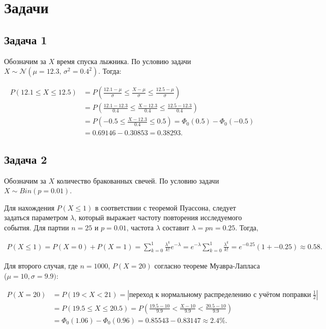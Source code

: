 \documentclass[a4paper,11pt]{article}
\begin{document}
\section{Задачи}

\subsection{Задача 1}

Обозначим за $X$ время спуска лыжника. По условию задачи $X \sim \mathcal{N}(\mu = 12.3,\,\sigma^{2} = 0.4^2)$. Тогда:

\begin{align*}
P(12.1 \leq X \leq 12.5) 
& = P(\frac{12.1-\mu}{\sigma} \leq \frac{X - \mu}{\sigma} \leq \frac{12.5-\mu}{\sigma}) \\
& = P(\frac{12.1-12.3}{0.4} \leq \frac{X - 12.3}{0.4} \leq \frac{12.5-12.3}{0.4}) \\
& = P(-0.5 \leq \frac{X - 12.3}{0.4} \leq 0.5) = \Phi_0(0.5) - \Phi_0(-0.5) \\
& = 0.69146 - 0.30853 = 0.38293.
\end{align*}

\subsection{Задача 2}

Обозначим за $X$ количество бракованных свечей. По условию задачи $X \sim Bin(p = 0.01)$.

\medskip

Для нахождения $P(X \leq 1)$ в соответствии с теоремой Пуассона, следует задаться параметром $\lambda$, который выражает частоту повторения исследуемого события. Для партии $n = 25$ и $p = 0.01$, частота $\lambda$ составит $\lambda = pn = 0.25$. Тогда,

\begin{align*}
P(X \leq 1) = P(X=0) + P(X=1) = \sum_{k=0}^{1}\frac{\lambda^k}{k!}e^{-\lambda}
= e^{-\lambda}\sum_{k=0}^{1}\frac{\lambda^k}{k!} = e^{-0.25}(1 + -0.25) \approx 0.58.
\end{align*}

\medskip

Для второго случая, где $n = 1000$, $P(X = 20)$ согласно теореме Муавра-Лапласа ($\mu = 10, \sigma = 9.9)$:

\begin{align*}
P(X = 20) & = P(19 < X < 21) = |\text{переход к нормальному распределению с учётом поправки}\ \frac{1}{2}| \\ 
& = P(19.5 \leq X \leq 20.5) = P(\frac{19.5-10}{9.9} < \frac{X-10}{9.9} < \frac{20.5-10}{9.9}) \\
& = \Phi_0(1.06) - \Phi_0(0.96) = 0.85543 - 0.83147 \approx 2.4\%.
\end{align*}
\end{document}
